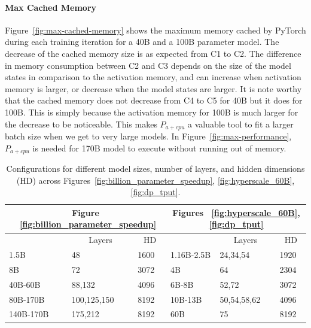 \paragraph{Max Cached Memory}
Figure~\ref{fig:max-cached-memory} shows the maximum memory cached by PyTorch during each training iteration for a 40B and a 100B parameter model. The decrease of the cached memory size is as expected from C1 to C2. The difference in memory consumption between C2 and C3 depends on the size of the model states in comparison to the activation memory, and can increase when activation memory is larger, or decrease when the model states are larger. It is note worthy that the cached memory does not decrease from C4 to C5 for 40B but it does for 100B. This is simply because the activation memory for 100B is much larger for the decrease to be noticeable. This makes $P_{a+cpu}$ a valuable tool to fit a larger batch size when we get to very large models. In Figure~\ref{fig:max-performance}, $P_{a+cpu}$ is needed for 170B model to execute without running out of memory.

\begin{table}[]
\centering
\begin{tabular}{|l|l|l|l|l|l|}
\hline
\multicolumn{3}{|c|}{Figure ~\ref{fig:billion_parameter_speedup}} & \multicolumn{3}{c|}{Figures ~\ref{fig:hyperscale_60B}, \ref{fig:dp_tput}} \\ \hline
\multicolumn{1}{|c|}{} & \multicolumn{1}{c|}{Layers} & \multicolumn{1}{c|}{HD} & \multicolumn{1}{c|}{} & \multicolumn{1}{c|}{Layers} & \multicolumn{1}{c|}{HD} \\ \hline
1.5B      & 48          & 1600 & 1.16B-2.5B  & 24,34,54    & 1920 \\ \hline
8B        & 72          & 3072 & 4B          & 64          & 2304 \\ \hline
40B-60B   & 88,132      & 4096 & 6B-8B       & 52,72       & 3072 \\ \hline
80B-170B  & 100,125,150 & 8192 & 10B-13B     & 50,54,58,62 & 4096 \\ \hline
140B-170B & 175,212     & 8192 & 60B         & 75          & 8192 \\ \hline
\end{tabular}
\caption{Configurations for different model sizes, number of layers, and hidden dimensions (HD) across Figures~\ref{fig:billion_parameter_speedup}, \ref{fig:hyperscale_60B}, \ref{fig:dp_tput}.} \label{tab:model-configuration}
\end{table}

